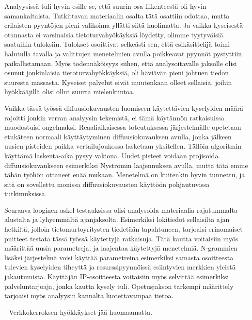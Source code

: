 Analyysissä tuli hyvin esille se, että suurin osa liikenteestä oli hyvin samankaltaista. Tutkittavan materiaalin osalta tätä osattiin odottaa, mutta erilaisten pyyntöjen pieni valikoima yllätti
siitä huolimatta. Ja vaikka kyseisestä otannasta ei varsinaisia tietoturvahyökäyksiä löydetty, olimme tyytyväisiä saatuihin tuloksiin. Tulokset osoittivat selkeästi sen, että esikäsittelijä toimi halutulla tavalla ja 
valittujen menetelmien avulla poikkeavat pyynnöt pystyttiin paikallistamaan. Myös todennäköisyys siihen, että analysoitavalle jaksolle olisi osunut jonkinlaisia tietoturvahyökkäyksiä, oli häviävän pieni
johtuen tiedon suuresta massasta. Kyseiset palvelut eivät muutenkaan olleet sellaisia, joihin hyökkääjillä olisi ollut suurta mielenkiintoa.  

Vaikka tässä työssä diffuusiokuvausten luomiseen käytettävien kyselyiden määrä rajoitti jonkin verran analyysin tekemistä, ei tämä käytännön ratkaisuissa muodostuisi ongelmaksi. Reaaliaikaisessa toteutuksessa
järjestelmälle opetetaan etukäteen normaali käyttäytyminen diffuusiokuvauksen avulla, jonka jälkeen uusien pisteiden paikka vertailujoukossa lasketaan yksitellen. Tällöin algoritmin käyttämä laskenta-aika
pysyy vakiona. Uudet pisteet voidaan projisoida diffuusiokuvaukseen esimerkiksi Nyströmin laajennuksen avulla, mutta tätä emme tähän työhön ottaneet enää mukaan. Menetelmä on kuitenkin hyvin tunnettu,
ja sitä on sovellettu monissa diffuusiokuvausten käyttöön pohjautuvissa tutkimuksissa.  

Seuraava looginen askel testauksissa olisi analysoida materiaalia rajatummalta alustalta ja lyhyemmältä ajanjaksolta. Esimerkiksi lokitiedot sellaisilta ajan hetkiltä, jolloin tietomurtoyritysten tiedetään tapahtuneen,
tarjoaisi erinomaiset puitteet testata tässä työssä käytettyjä ratkaisuja. Tätä kautta voitaisiin myös määrittää uusia parametreja, ja laajentaa käytettyjä menetelmiä. N-grammien lisäksi järjestelmä
voisi käyttää parametreina esimerkiksi samasta osoitteesta tulevien kyselyiden tiheyttä ja resurssipyynnöissä esiintyvien merkkien yleistä jakautumista. Käyttäjän IP-osoitteesta voitaisiin myös selvittää esimerkiksi
palveluntarjoaja, jonka kautta kysely tuli. Opetusjakson tarkempi määrittely tarjoaisi myös analyysin kannalta luotettavampaa tietoa. 

- Verkkokerroksen hyökkäykset jää huomaamatta. 
